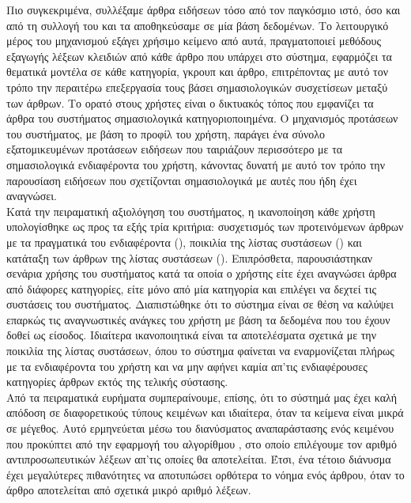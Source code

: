 Πιο συγκεκριμένα, συλλέξαμε άρθρα ειδήσεων τόσο από τον παγκόσμιο ιστό, όσο και από τη συλλογή {} του {} 
και τα αποθηκεύσαμε σε μία βάση δεδομένων. 
Το λειτουργικό μέρος του μηχανισμού εξάγει χρήσιμο κείμενο από αυτά, πραγματοποιεί μεθόδους εξαγωγής λέξεων
κλειδιών από κάθε άρθρο που υπάρχει στο σύστημα, εφαρμόζει τα θεματικά μοντέλα σε κάθε κατηγορία, γκρουπ και άρθρο, 
επιτρέποντας με αυτό τον τρόπο την περαιτέρω επεξεργασία τους βάσει σημασιολογικών συσχετίσεων μεταξύ των άρθρων.
Το ορατό στους χρήστες είναι ο δικτυακός τόπος που εμφανίζει τα άρθρα του συστήματος σημασιολογικά κατηγοριοποιημένα. 
Ο μηχανισμός προτάσεων του συστήματος, με βάση το προφίλ του χρήστη, 
παράγει ένα σύνολο εξατομικευμένων προτάσεων ειδήσεων που ταιριάζουν περισσότερο με τα
σημασιολογικά ενδιαφέροντα του χρήστη, κάνοντας δυνατή με αυτό τον τρόπο την
παρουσίαση ειδήσεων που σχετίζονται σημασιολογικά με αυτές που ήδη έχει
αναγνώσει. \\

Κατά την πειραματική αξιολόγηση του συστήματος, η ικανοποίηση κάθε χρήστη υπολογίσθηκε ως προς τα εξής τρία κριτήρια: 
συσχετισμός των προτεινόμενων άρθρων με τα πραγματικά του ενδιαφέροντα ({}), 
ποικιλία της λίστας συστάσεων ({}) και 
κατάταξη των άρθρων της λίστας συστάσεων ({}). 
Επιπρόσθετα, παρουσιάστηκαν σενάρια χρήσης του συστήματος κατά τα οποία ο χρήστης 
είτε έχει αναγνώσει άρθρα από διάφορες κατηγορίες, είτε μόνο από μία κατηγορία 
και επιλέγει να δεχτεί τις συστάσεις του συστήματος. 
Διαπιστώθηκε ότι το σύστημα είναι σε θέση να καλύψει επαρκώς τις αναγνωστικές ανάγκες του χρήστη 
με βάση τα δεδομένα που του έχουν δοθεί ως είσοδος. 
Iδιαίτερα ικανοποιητικά είναι τα αποτελέσματα σχετικά με την ποικιλία της λίστας 
συστάσεων, όπου το σύστημα φαίνεται να εναρμονίζεται πλήρως με τα 
ενδιαφέροντα του χρήστη και να μην αφήνει καμία απ'τις ενδιαφέρουσες κατηγορίες 
άρθρων εκτός της τελικής σύστασης.\\

Από τα πειραματικά ευρήματα συμπεραίνουμε, επίσης, ότι το σύστημά μας έχει 
καλή απόδοση σε διαφορετικούς τύπους κειμένων και ιδιαίτερα, όταν τα
κείμενα είναι μικρά σε μέγεθος. Aυτό ερμηνεύεται μέσω του διανύσματος αναπαράστασης ενός κειμένου 
που προκύπτει από την εφαρμογή του αλγορίθμου {}, 
στο οποίο επιλέγουμε τον αριθμό αντιπροσωπευτικών λέξεων απ'τις οποίες θα αποτελείται.
Έτσι, ένα τέτοιο διάνυσμα έχει μεγαλύτερες πιθανότητες να αποτυπώσει ορθότερα το νόημα ενός άρθρου, 
όταν το άρθρο αποτελείται από σχετικά μικρό αριθμό λέξεων. \\

